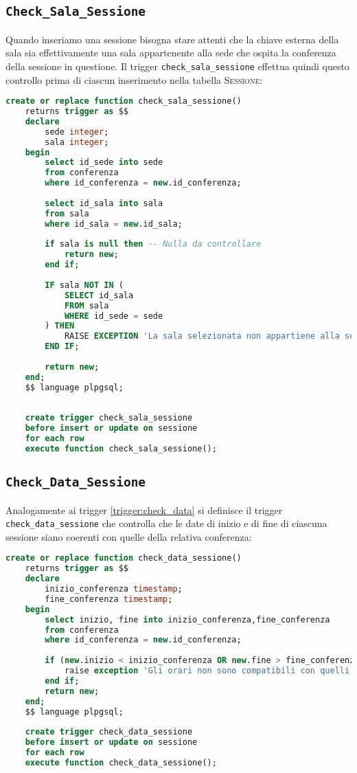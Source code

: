 \subsection{\texttt{Check\_Sala\_Sessione}}
Quando inseriamo una sessione bisogna stare attenti che la chiave esterna della sala sia effettivamente una sala appartenente alla sede che ospita la conferenza della sessione in questione. Il trigger \texttt{check\_sala\_sessione} effettua quindi questo controllo prima di ciascun inserimento nella tabella \textsc{Sessione}:
\begin{lstlisting}[language=SQL, style=mystyle]
	create or replace function check_sala_sessione() 
	returns trigger as $$
	declare
		sede integer;
		sala integer;
	begin
		select id_sede into sede
		from conferenza
		where id_conferenza = new.id_conferenza;
	
		select id_sala into sala
		from sala
		where id_sala = new.id_sala;
		
		if sala is null then -- Nulla da controllare
			return new;
		end if;
		
		IF sala NOT IN (
			SELECT id_sala
			FROM sala
			WHERE id_sede = sede
		) THEN
			RAISE EXCEPTION 'La sala selezionata non appartiene alla sede della conferenza';
		END IF;
		
		return new;
	end;
	$$ language plpgsql;
	
	
	create trigger check_sala_sessione
	before insert or update on sessione
	for each row
	execute function check_sala_sessione();
\end{lstlisting}
\subsection{\texttt{Check\_Data\_Sessione}}
Analogamente ai trigger \ref{trigger:check_data} si definisce il trigger \texttt{check\_data\_sessione} che controlla che le date di inizio e di fine di ciascuna sessione siano coerenti con quelle della relativa conferenza:
\begin{lstlisting}[language=SQL, style=mystyle, caption={\texttt{check\_data\_sessione}}]
	create or replace function check_data_sessione() 
	returns trigger as $$
	declare
		inizio_conferenza timestamp;
		fine_conferenza timestamp;
	begin
		select inizio, fine into inizio_conferenza,fine_conferenza
		from conferenza
		where id_conferenza = new.id_conferenza;
	
		if (new.inizio < inizio_conferenza OR new.fine > fine_conferenza) then
			raise exception 'Gli orari non sono compatibili con quelli della conferenza';
		end if;
		return new;
	end;
	$$ language plpgsql;
	
	create trigger check_data_sessione
	before insert or update on sessione
	for each row
	execute function check_data_sessione();
\end{lstlisting}
